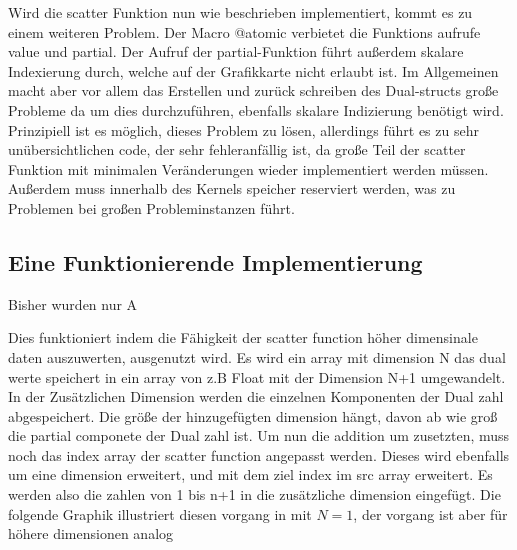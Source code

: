 Wird die scatter Funktion nun wie beschrieben implementiert, kommt es zu einem weiteren Problem.
Der Macro @atomic verbietet die Funktions aufrufe value und partial.
Der Aufruf der partial-Funktion führt außerdem skalare Indexierung durch, welche auf der Grafikkarte nicht erlaubt ist.
Im Allgemeinen macht aber vor allem das Erstellen und zurück schreiben des Dual-structs große Probleme
da um dies durchzuführen, ebenfalls skalare Indizierung benötigt wird.
Prinzipiell ist es möglich, dieses Problem zu lösen, 
allerdings führt es zu sehr unübersichtlichen code, der sehr fehleranfällig ist, 
da große Teil der scatter Funktion mit minimalen Veränderungen wieder implementiert werden müssen.
Außerdem muss innerhalb des Kernels speicher reserviert werden, was zu Problemen bei großen Probleminstanzen führt.

\subsection{Eine Funktionierende Implementierung} \label{sec:funktional_implementation}

Bisher wurden nur A


Dies funktioniert indem die Fähigkeit der scatter function höher dimensinale daten auszuwerten, ausgenutzt wird. 
Es wird ein array mit dimension N das dual werte speichert in ein array von z.B Float mit der Dimension N+1 umgewandelt. 
In der Zusätzlichen Dimension werden die einzelnen Komponenten der Dual zahl abgespeichert.
Die größe der hinzugefügten dimension hängt, davon ab wie groß die partial componete der Dual zahl ist.
Um nun die addition um zusetzten, muss noch das index array der scatter function angepasst werden.
Dieses wird ebenfalls um eine dimension erweitert, und mit dem ziel index im src array erweitert.
Es werden also die zahlen von 1 bis n+1 in die zusätzliche dimension eingefügt.
Die folgende Graphik illustriert diesen vorgang in mit $N = 1$, der vorgang ist aber für höhere dimensionen analog

